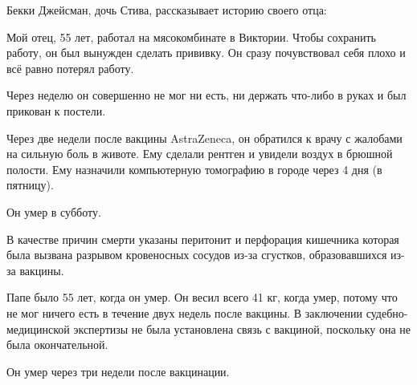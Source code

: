 Бекки Джейсман, дочь Стива, рассказывает историю своего отца:

Мой отец, 55 лет, работал на мясокомбинате в Виктории. Чтобы сохранить работу,
он был вынужден сделать прививку. Он сразу почувствовал себя плохо и всё равно
потерял работу.

Через неделю он совершенно не мог ни есть, ни держать что-либо в руках и был
прикован к постели.

Через две недели после вакцины AstraZeneca, он обратился к врачу с жалобами на
сильную боль в животе. Ему сделали рентген и увидели воздух в брюшной
полости. Ему назначили компьютерную томографию в городе через 4 дня (в пятницу).

Он умер в субботу.

В качестве причин смерти указаны перитонит и перфорация кишечника которая была
вызвана разрывом кровеносных сосудов из-за сгустков, образовавшихся из-за
вакцины.

Папе было 55 лет, когда он умер. Он весил всего 41 кг, когда умер, потому что не
мог ничего есть в течение двух недель после вакцины. В заключении
судебно-медицинской экспертизы не была установлена связь с вакциной, поскольку
она не была окончательной.

Он умер через три недели после вакцинации.
